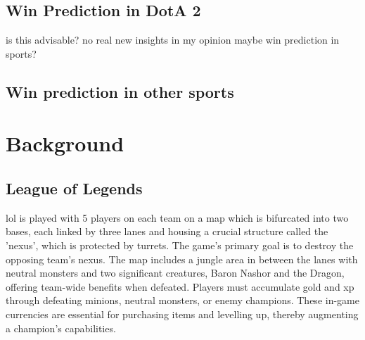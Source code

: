 \documentclass[12pt, a4paper, headinclude, twoside, plainheadsepline, open=right, numbers=noenddot, hidelinks, toc=listof, toc=bibliography]{scrreprt}
\begin{document}
\section{Win Prediction in DotA 2}
\label{sec:dota}
is this advisable? no real new insights in my opinion
maybe win prediction in sports?
%


%
%
%

\section{Win prediction in other sports}
\label{sec:other_sports}


\chapter{Background}
\label{chap:background}

\section{League of Legends}
\label{sec:LoL}

\Ac{lol} is played with 5 players on each team on a map which is bifurcated into two bases, each linked by three lanes and housing a crucial structure called the 'nexus', which is protected by turrets. 
The game's primary goal is to destroy the opposing team's nexus.
The map includes a jungle area in between the lanes with neutral monsters and two significant creatures, Baron Nashor and the Dragon, offering team-wide benefits when defeated.
Players must accumulate gold and \ac{xp} through defeating minions, neutral monsters, or enemy champions. 
These in-game currencies are essential for purchasing items and levelling up, thereby augmenting a champion's capabilities.
\end{document}
